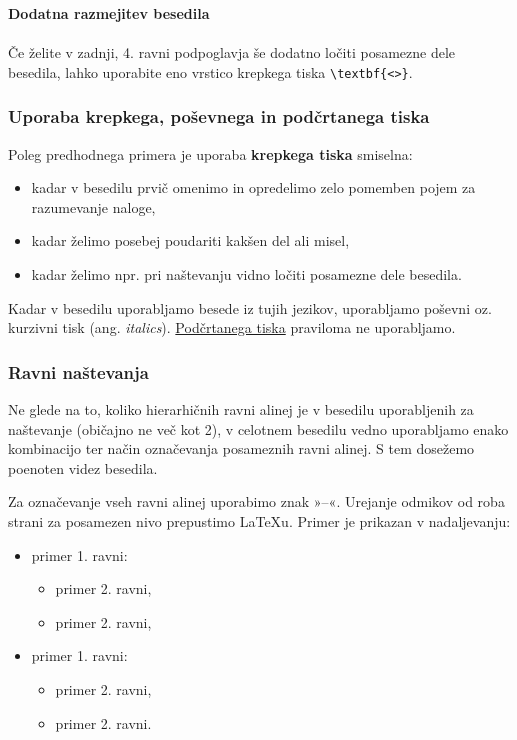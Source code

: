 \textbf{Dodatna razmejitev besedila}\\ \\
Če želite v zadnji, 4. ravni podpoglavja še dodatno ločiti posamezne dele besedila, lahko uporabite eno vrstico krepkega tiska \verb|\textbf{<>}|.

\subsubsection{Uporaba krepkega, poševnega in podčrtanega tiska}\label{sec:emphasis_types}

Poleg predhodnega primera je uporaba \textbf{krepkega tiska} smiselna:
\begin{itemize}
	\item kadar v besedilu prvič omenimo in opredelimo zelo pomemben pojem za razumevanje naloge,
	\item kadar želimo posebej poudariti kakšen del ali misel,
	\item kadar želimo npr. pri naštevanju vidno ločiti posamezne dele besedila.
\end{itemize}

Kadar v besedilu uporabljamo besede iz tujih jezikov, uporabljamo poševni oz. kurzivni tisk (ang. \emph{italics}). \underline{Podčrtanega tiska} praviloma ne uporabljamo.


\subsubsection{Ravni naštevanja}\label{sec:itemizing}

Ne glede na to, koliko hierarhičnih ravni alinej je v besedilu uporabljenih za naštevanje (običajno ne več kot 2), v celotnem besedilu vedno uporabljamo enako kombinacijo ter način označevanja posameznih ravni alinej. S tem dosežemo poenoten videz besedila.

Za označevanje vseh ravni alinej uporabimo znak »--«. Urejanje odmikov od roba strani za posamezen nivo prepustimo \LaTeX u. Primer je prikazan v nadaljevanju:
\begin{itemize}
	\item primer 1. ravni:
	\begin{itemize}
		\item primer 2. ravni,
		\item primer 2. ravni,
	\end{itemize}
	\item primer 1. ravni:
	\begin{itemize}
		\item primer 2. ravni,
		\item primer 2. ravni.
	\end{itemize}
\end{itemize}

